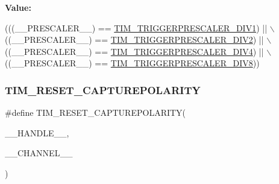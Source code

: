 {\bfseries Value\+:}
\begin{DoxyCode}
(((\_\_PRESCALER\_\_) == \hyperlink{group___t_i_m___trigger___prescaler_ga02ab6f24e367cd972a1e0c1df326a7a3}{TIM\_TRIGGERPRESCALER\_DIV1}) || \(\backslash\)
                                                ((\_\_PRESCALER\_\_) == 
      \hyperlink{group___t_i_m___trigger___prescaler_ga1350c5659a17a66df69b444871907d83}{TIM\_TRIGGERPRESCALER\_DIV2}) || \(\backslash\)
                                                ((\_\_PRESCALER\_\_) == 
      \hyperlink{group___t_i_m___trigger___prescaler_ga195dd56e15ea4733e19518fb431dfb8d}{TIM\_TRIGGERPRESCALER\_DIV4}) || \(\backslash\)
                                                ((\_\_PRESCALER\_\_) == 
      \hyperlink{group___t_i_m___trigger___prescaler_ga78edbcf4caf228de0daa4b7f698f578f}{TIM\_TRIGGERPRESCALER\_DIV8}))
\end{DoxyCode}
\mbox{\label{group___t_i_m___private___macros_gada7535acf7e1f9b3e8e1dcca848871db}} 
\subsubsection{\texorpdfstring{T\+I\+M\+\_\+\+R\+E\+S\+E\+T\+\_\+\+C\+A\+P\+T\+U\+R\+E\+P\+O\+L\+A\+R\+I\+TY}{TIM\_RESET\_CAPTUREPOLARITY}}
{\footnotesize\ttfamily \#define T\+I\+M\+\_\+\+R\+E\+S\+E\+T\+\_\+\+C\+A\+P\+T\+U\+R\+E\+P\+O\+L\+A\+R\+I\+TY(\begin{DoxyParamCaption}\item[{}]{\+\_\+\+\_\+\+H\+A\+N\+D\+L\+E\+\_\+\+\_\+,  }\item[{}]{\+\_\+\+\_\+\+C\+H\+A\+N\+N\+E\+L\+\_\+\+\_\+ }\end{DoxyParamCaption})}

